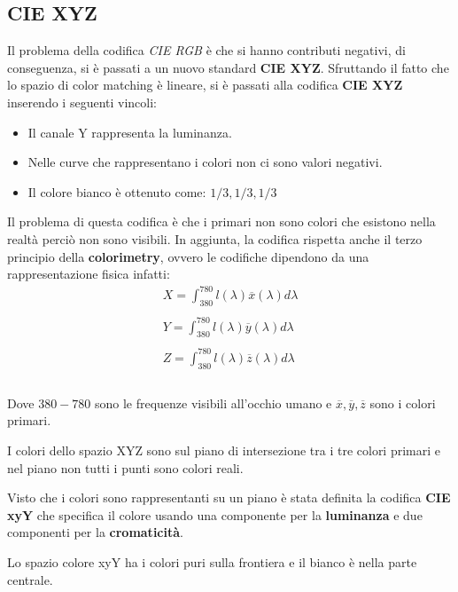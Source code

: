 \subsection{CIE XYZ}
Il problema della codifica \textit{CIE RGB} è che si hanno contributi negativi,
di conseguenza, si è passati a un nuovo standard \textbf{CIE XYZ}. Sfruttando il
fatto che lo spazio di color matching è lineare, si è passati alla codifica \textbf{CIE XYZ}
inserendo i seguenti vincoli:
\begin{itemize}
    \item Il canale Y rappresenta la luminanza.
    \item Nelle curve che rappresentano i colori non ci sono valori negativi.
    \item Il colore bianco è ottenuto come: $1/3, 1/3, 1/3$
\end{itemize}
Il problema di questa codifica è che i primari non sono colori che esistono nella
realtà perciò non sono visibili. In aggiunta, la codifica rispetta anche il terzo
principio della \textbf{colorimetry}, ovvero le codifiche dipendono da una
rappresentazione fisica infatti:
\begin{equation*}
    \begin{array}{c}
        X = \int_{380}^{780} l(\lambda) \overline{x}(\lambda)d \lambda \\\\
        Y = \int_{380}^{780} l(\lambda) \overline{y}(\lambda)d \lambda \\\\
        Z = \int_{380}^{780} l(\lambda) \overline{z}(\lambda)d \lambda \\\\
    \end{array}
\end{equation*}

Dove $380-780$ sono  le frequenze visibili all'occhio umano e $\overline{x},
    \overline{y},\overline{z}$ sono i colori primari.

I colori dello spazio XYZ sono sul piano di intersezione tra i tre colori primari
e nel piano non tutti i punti sono colori reali.

Visto che i colori sono rappresentanti su un piano è stata definita la codifica
\textbf{CIE xyY} che specifica il colore usando una componente per la
\textbf{luminanza} e due componenti per la \textbf{cromaticità}.

Lo spazio colore xyY ha i colori puri sulla frontiera e il bianco è nella parte
centrale.

